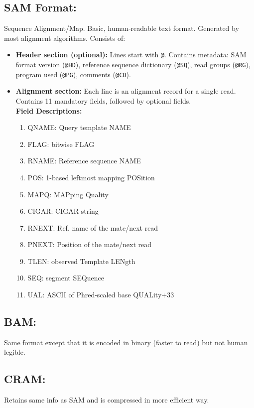 \documentclass[../main.tex]{subfiles}
\begin{document}
\subsection*{SAM Format:} Sequence Alignment/Map. Basic, human-readable text format. Generated by most alignment algorithms. Consists of:
\begin{itemize}
    \item \textbf{Header section (optional):} Lines start with \texttt{@}. Contains metadata: SAM format version (\texttt{@HD}), reference sequence dictionary (\texttt{@SQ}), read groups (\texttt{@RG}), program used (\texttt{@PG}), comments (\texttt{@CO}).
    \item \textbf{Alignment section:} Each line is an alignment record for a single read. Contains 11 mandatory fields, followed by optional fields. \\
    \textbf{Field Descriptions:}
    \begin{enumerate}
        \item QNAME: Query template NAME
        \item FLAG: bitwise FLAG
        \item RNAME: Reference sequence NAME
        \item POS: 1-based leftmost mapping POSition
        \item MAPQ: MAPping Quality
        \item CIGAR: CIGAR string
        \item RNEXT: Ref. name of the mate/next read
        \item PNEXT: Position of the mate/next read
        \item TLEN: observed Template LENgth
        \item SEQ: segment SEQuence
        \item UAL: ASCII of Phred-scaled base QUALity+33
    \end{enumerate}
\end{itemize}

\subsection*{BAM:} Same format except that it is encoded in binary (faster to read) but not human legible.

\subsection*{CRAM:} Retains same info as SAM and is compressed in more efficient way.
\end{document}
